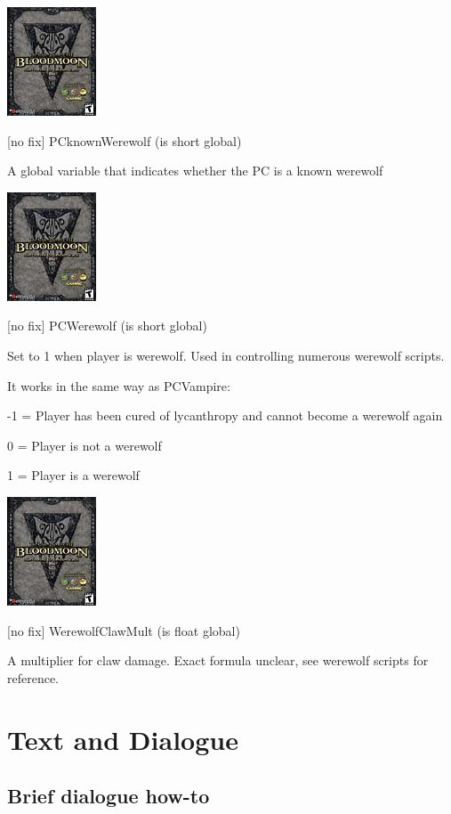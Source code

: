 \includegraphics{media/image7.png}

{[}no fix{]} PCknownWerewolf (is short global)

A global variable that indicates whether the PC is a known werewolf

\includegraphics{media/image7.png}

{[}no fix{]} PCWerewolf (is short global)

Set to 1 when player is werewolf. Used in controlling numerous werewolf
scripts.

It works in the same way as PCVampire:

-1 = Player has been cured of lycanthropy and cannot become a werewolf
again

0 = Player is not a werewolf

1 = Player is a werewolf

\includegraphics{media/image7.png}

{[}no fix{]} WerewolfClawMult (is float global)

A multiplier for claw damage. Exact formula unclear, see werewolf
scripts for reference.

\hypertarget{text-and-dialogue}{%
\section{\texorpdfstring{\hfill\break
Text and Dialogue}{ Text and Dialogue}}\label{text-and-dialogue}}

\hypertarget{brief-dialogue-how-to}{%
\subsection{Brief dialogue how-to}\label{brief-dialogue-how-to}}

